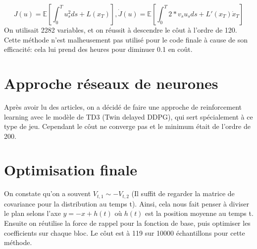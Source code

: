 \documentclass[12pt]{article}
\begin{document}
\[
    J(u) = \mathbb{E} \left[ \int_0^T u_s^2 ds + L(x_T) \right], \dot{J}(u) = \mathbb{E}\left[ \int_0^T 2 * v_s u_s ds + L'(x_T)\dot{x}_T \right]
\]
On utilisait 2282 variables, et on réussit à descendre le côut à l'ordre de 120. Cette méthode n'est malheusement pas utilisé pour le code finale à cause de son efficacité: cela lui prend des heures pour diminuer 0.1 en coût.

\section{Approche réseaux de neurones}
Après avoir lu des articles, on a décidé de faire une approche de reinforcement learning avec le modèle de TD3 (Twin delayed DDPG), qui sert spécialement à ce type de jeu. Cependant le côut ne converge pas et le minimum était de l'ordre de 200.

\section{Optimisation finale}
On constate qu'on a souvent $V_{t, 1} \sim -V_{t, 2}$ (Il suffit de regarder la matrice de covariance pour la distribution au temps t). Ainsi, cela nous fait penser à diviser le plan selons l'axe $y=-x + h(t)$ où $h(t)$ est la position moyenne au temps t. Ensuite on réutilise la force de rappel pour la fonction de base, puis optimiser les coefficients sur chaque bloc. Le côut est à 119 sur 10000 échantillons pour cette méthode.
\end{document}
